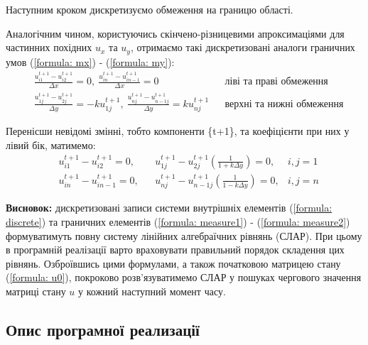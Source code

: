 \documentclass[a4paper,14pt]{extarticle} %
\begin{document}
Наступним кроком дискретизуємо обмеження на границю області.

Аналогічним чином, користуючись скінчено-різницевими апроксимаціями для частинних похідних $u_x$ та $u_y$, 
отримаємо такі дискретизовані аналоги граничних умов (\ref{formula: mx}) - (\ref{formula: my}):
\begin{align*}
    &\frac{u_{i1}^{t+1}-u_{i2}^{t+1}}{\Delta x}=0,\ \frac{u_{in}^{t+1}-u_{in-1}^{t+1}}{\Delta x}=0 && \text{ліві та праві обмеження} \\
    &\frac{u_{1j}^{t+1}-u_{2j}^{t+1}}{\Delta y}=-ku_{1j}^{t+1},\ \frac{u_{nj}^{t+1}-u_{n-1j}^{t+1}}{\Delta y}=ku_{nj}^{t+1} && \text{верхні та нижні обмеження}
\end{align*}

Перенісши невідомі змінні, тобто компоненти \{t+1\}, та коефіцієнти при них у лівий бік, матимемо:
\begin{align}
    &u_{i1}^{t+1}-u_{i2}^{t+1}=0, &&u_{1j}^{t+1}-u_{2j}^{t+1}\left( \tfrac{1}{1+k\Delta y} \right)=0, &i,j = 1 \label{formula: measure1} \\
    &u_{in}^{t+1}-u_{in-1}^{t+1}=0, &&u_{nj}^{t+1}-u_{n-1j}^{t+1}\left( \tfrac{1}{1-k\Delta y} \right)=0, &i,j = n \label{formula: measure2} 
\end{align}

\textbf{Висновок:} дискретизовані записи системи внутрішніх елементів (\ref{formula: discrete}) та граничних елементів 
(\ref{formula: measure1}) - (\ref{formula: measure2}) формуватимуть повну систему лінійних алгебраїчних рівнянь 
(СЛАР). При цьому в програмній реалізації варто враховувати правильний порядок складення цих рівнянь. Озброївшись 
цими формулами, а також початковою матрицею стану (\ref{formula: u0}), покроково розв'язуватимемо СЛАР у пошуках 
чергового значення матриці стану $u$ у кожний наступний момент часу. 

\subsection*{Опис програмної реализації}
\end{document}
